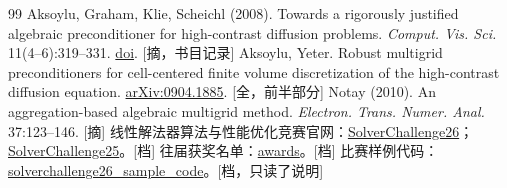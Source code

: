 \documentclass[11pt,a4paper]{ctexart}
\begin{document}
\begin{thebibliography}{99}
 Aksoylu, Graham, Klie, Scheichl (2008). Towards a rigorously justified algebraic preconditioner for high-contrast diffusion problems. \emph{Comput. Vis. Sci.} 11(4--6):319--331. \href{https://doi.org/10.1007/s00791-008-0105-1}{doi}. [摘，书目记录]
 Aksoylu, Yeter. Robust multigrid preconditioners for cell-centered finite volume discretization of the high-contrast diffusion equation. \href{https://arxiv.org/abs/0904.1885}{arXiv:0904.1885}. [全，前半部分]
 Notay (2010). An aggregation-based algebraic multigrid method. \emph{Electron. Trans. Numer. Anal.} 37:123--146. [摘]
 线性解法器算法与性能优化竞赛官网：\href{https://www.solver-conference.cn/solverchallenge26/}{SolverChallenge26}；\href{https://www.solver-conference.cn/solverchallenge25/}{SolverChallenge25}。[档]
 往届获奖名单：\href{https://www.solver-conference.cn/solverchallenge26/awards.html}{awards}。[档]
 比赛样例代码：\href{https://gitee.com/godjs/solverchallenge26_sample_code}{solverchallenge26\_sample\_code}。[档，只读了说明]
\end{thebibliography}
\end{document}
